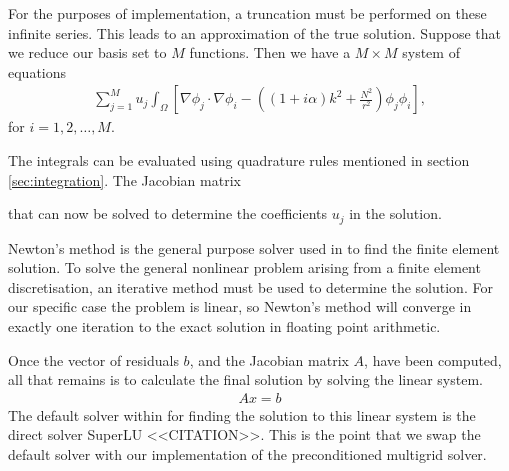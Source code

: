 For the purposes of implementation, a truncation must be performed on these infinite series.
This leads to an approximation of the true solution.
Suppose that we reduce our basis set to $M$ functions.
Then we have a $M\times M$ system of equations 
\begin{align}
	\sum_{j=1}^M u_j \int_\Omega \left[ \nabla \phi_j \cdot \nabla \phi_i - \left( (1+i\alpha)k^2 + \frac{N^2}{r^2}\right) \phi_j \phi_i \right],
\end{align}
for $i=1,2,\ldots,M$.



The integrals can be evaluated using quadrature rules mentioned in section \ref{sec:integration}.
The Jacobian matrix


that can now be solved to determine the coefficients $u_j$ in the solution.




Newton's method is the general purpose solver used in \oomph to find the finite element solution.
To solve the general nonlinear problem arising from a finite element discretisation, an iterative method must be used to determine the solution.
For our specific case the problem is linear, so Newton's method will converge in exactly one iteration to the exact solution in floating point arithmetic.

Once the vector of residuals $b$, and the Jacobian matrix $A$, have been computed, all that remains is to calculate the final solution by solving the linear system.
\begin{align}
	A x = b
\end{align}
The default solver within \oomph for finding the solution to this linear system is the direct solver SuperLU <<CITATION>>.
This is the point that we swap the default solver with our implementation of the preconditioned multigrid solver.
